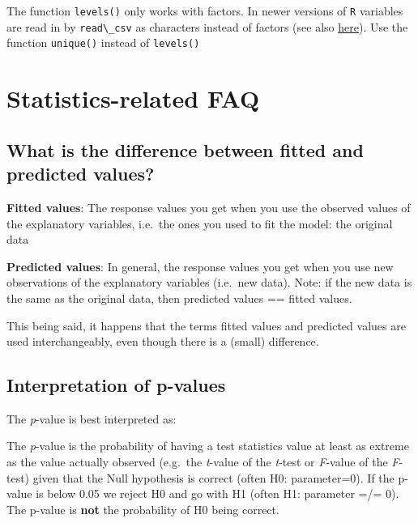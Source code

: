 \documentclass[
  letterpaper,
  8pt,
  a4paper]{book}
\begin{document}
The function \texttt{levels()} only works with factors. In newer
versions of \texttt{R} variables are read in by
\texttt{read\textbackslash{}\_csv} as characters instead of factors (see
also
\href{https://lms.uzh.ch/auth/RepositoryEntry/17168236698/CourseNode/104350296466146/path\%3DDifferent\%5Foutput\%5Fof\%5Fsummary\%28\%29~~str\%28\%29~~Etc.\%5Ffunction\%5Fthan\%5Fwhat\%5Fis\%5Fshown\%5Fin\%5Fvideo/0}{here}).
Use the function \texttt{unique()} instead of \texttt{levels()}

\section*{Statistics-related FAQ}\label{statistics-related-faq}


\subsection*{What is the difference between fitted and predicted
values?}\label{what-is-the-difference-between-fitted-and-predicted-values}

\textbf{Fitted values}: The response values you get when you use the
observed values of the explanatory variables, i.e.~the ones you used to
fit the model: the original data

\textbf{Predicted values}: In general, the response values you get when
you use new observations of the explanatory variables (i.e.~new data).
Note: if the new data is the same as the original data, then predicted
values == fitted values.

This being said, it happens that the terms fitted values and predicted
values are used interchangeably, even though there is a (small)
difference.

\subsection*{Interpretation of
p-values}\label{interpretation-of-p-values}

The \emph{p}-value is best interpreted as:

The \emph{p}-value is the probability of having a test statistics value
at least as extreme as the value actually observed (e.g.~the
\emph{t}-value of the \emph{t}-test or \emph{F}-value of the
\emph{F}-test) given that the Null hypothesis is correct (often H0:
parameter=0). If the p-value is below 0.05 we reject H0 and go with H1
(often H1: parameter =/= 0). The p-value is \textbf{not} the probability
of H0 being correct.
\end{document}

